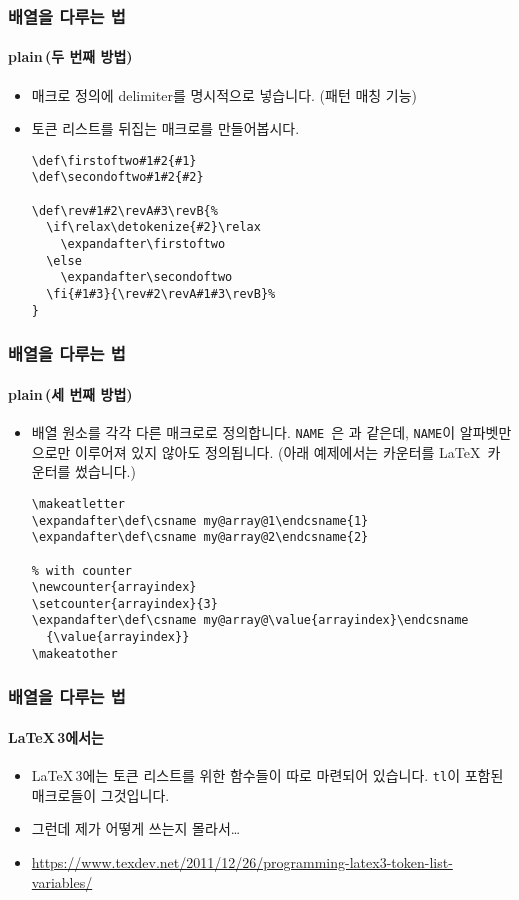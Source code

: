 \begin{frame}[fragile]
  \frametitle{배열을 다루는 법}
  \framesubtitle{plain\, (두 번째 방법)}
  \begin{itemize}
    \item 매크로 정의에 delimiter를 명시적으로 넣습니다. (패턴 매칭 기능)
    \item 토큰 리스트를 뒤집는 매크로를 만들어봅시다.
    \vspace{-1.5em}\begin{verbatim}
\def\firstoftwo#1#2{#1}
\def\secondoftwo#1#2{#2}

\def\rev#1#2\revA#3\revB{%
  \if\relax\detokenize{#2}\relax
    \expandafter\firstoftwo
  \else
    \expandafter\secondoftwo
  \fi{#1#3}{\rev#2\revA#1#3\revB}%
}
    \end{verbatim}
  \end{itemize}
\end{frame}

\begin{frame}[fragile]
  \frametitle{배열을 다루는 법}
  \framesubtitle{plain\, (세 번째 방법)}
  \begin{itemize}
    \item 배열 원소를 각각 다른 매크로로 정의합니다. \texttt{\csname NAME \endcsname}은 \texttt{\NAME}과 같은데, \texttt{NAME}이 알파벳만으로만 이루어져 있지 않아도 정의됩니다. (아래 예제에서는 카운터를 \LaTeX\ 카운터를 썼습니다.)
    \vspace{-1.5em}\begin{verbatim}
\makeatletter
\expandafter\def\csname my@array@1\endcsname{1}
\expandafter\def\csname my@array@2\endcsname{2}

% with counter
\newcounter{arrayindex}
\setcounter{arrayindex}{3}
\expandafter\def\csname my@array@\value{arrayindex}\endcsname
  {\value{arrayindex}}
\makeatother
    \end{verbatim}
  \end{itemize}
\end{frame}

\begin{frame}[fragile]
  \frametitle{배열을 다루는 법}
  \framesubtitle{\LaTeX\,3에서는}
  \begin{itemize}
    \item \LaTeX\,3에는 토큰 리스트를 위한 함수들이 따로 마련되어 있습니다. \texttt{tl}이 포함된 매크로들이 그것입니다.
    \item 그런데 제가 어떻게 쓰는지 몰라서\dots
    \item \url{https://www.texdev.net/2011/12/26/programming-latex3-token-list-variables/}
  \end{itemize}
\end{frame}